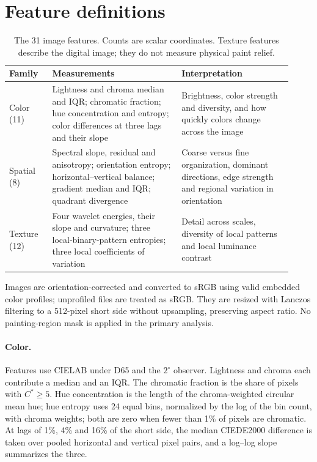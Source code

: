 \FloatBarrier
\section{Feature definitions}\label{app:features}

\begin{table}[ht]
\caption{The 31 image features. Counts are scalar coordinates. Texture features
describe the digital image; they do not measure physical paint relief.}
\label{tab:features}
\centering\small
\begin{tabular}{@{}p{0.14\linewidth}p{0.42\linewidth}p{0.36\linewidth}@{}}
\toprule
Family & Measurements & Interpretation\\
\midrule
Color (11) & Lightness and chroma median and IQR; chromatic fraction; hue
concentration and entropy; color differences at three lags and their slope &
Brightness, color strength and diversity, and how quickly colors change across
the image\\[3pt]
Spatial (8) & Spectral slope, residual and anisotropy; orientation entropy;
horizontal--vertical balance; gradient median and IQR; quadrant divergence &
Coarse versus fine organization, dominant directions, edge strength and regional
variation in orientation\\[3pt]
Texture (12) & Four wavelet energies, their slope and curvature; three
local-binary-pattern entropies; three local coefficients of variation & Detail across
scales, diversity of local patterns and local luminance contrast\\
\bottomrule
\end{tabular}
\end{table}

Images are orientation-corrected and converted to sRGB using valid embedded color
profiles; unprofiled files are treated as sRGB. They are resized with Lanczos
filtering to a 512-pixel short side without upsampling, preserving aspect ratio. No
painting-region mask is applied in the primary analysis.

\paragraph{Color.} Features use CIELAB under D65 and the $2^\circ$ observer.
Lightness and chroma each contribute a median and an IQR. The chromatic fraction is
the share of pixels with $C^*\ge5$. Hue concentration is the length of the
chroma-weighted circular mean hue; hue entropy uses 24 equal bins, normalized by the
log of the bin count, with chroma weights; both are zero when fewer than 1\% of pixels
are chromatic. At lags of 1\%, 4\% and 16\% of the short side, the median CIEDE2000
difference \citep{sharma2005ciede} is taken over pooled horizontal and vertical pixel
pairs, and a log--log slope summarizes the three.

